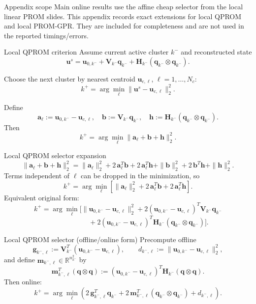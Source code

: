 \documentclass{beamer}
\begin{document}
\begin{frame}{Appendix scope}
\small
Main online results use the affine cheap selector from the local linear PROM slides.
This appendix records exact extensions for local QPROM and local PROM-GPR.
They are included for completeness and are not used in the reported timings/errors.
\end{frame}

\begin{frame}{Local QPROM criterion}
\small
Assume current active cluster $k^-$ and reconstructed state
\[
\mathbf u^s
=
\mathbf u_{0,k^-}
+
\mathbf V_{k^-}\mathbf q_{k^-}
+
\mathbf H_{k^-}(\mathbf q_{k^-}\otimes \mathbf q_{k^-}).
\]

Choose the next cluster by nearest centroid $\mathbf u_{c,\ell}$, $\ell=1,\dots,N_c$:
\[
k^+
=
\arg\min_{\ell}
\|\mathbf u^s-\mathbf u_{c,\ell}\|_2^2.
\]

Define
\[
\mathbf a_\ell:=\mathbf u_{0,k^-}-\mathbf u_{c,\ell},
\quad
\mathbf b:=\mathbf V_{k^-}\mathbf q_{k^-},
\quad
\mathbf h:=\mathbf H_{k^-}(\mathbf q_{k^-}\otimes \mathbf q_{k^-}).
\]
Then
\[
k^+=\arg\min_\ell \|\mathbf a_\ell+\mathbf b+\mathbf h\|_2^2.
\]
\end{frame}

\begin{frame}{Local QPROM selector expansion}
\scriptsize
\[
\|\mathbf a_\ell+\mathbf b+\mathbf h\|_2^2
=
\|\mathbf a_\ell\|_2^2
+
2\,\mathbf a_\ell^T\mathbf b
+
2\,\mathbf a_\ell^T\mathbf h
+
\|\mathbf b\|_2^2
+
2\,\mathbf b^T\mathbf h
+
\|\mathbf h\|_2^2.
\]
Terms independent of $\ell$ can be dropped in the minimization, so
\[
k^+
=
\arg\min_\ell
\left[
\|\mathbf a_\ell\|_2^2
+
2\,\mathbf a_\ell^T\mathbf b
+
2\,\mathbf a_\ell^T\mathbf h
\right].
\]
Equivalent original form:
\[
k^+
=
\arg\min_\ell
\Big[
\|\mathbf u_{0,k^-}-\mathbf u_{c,\ell}\|_2^2
+
2(\mathbf u_{0,k^-}-\mathbf u_{c,\ell})^T\mathbf V_{k^-}\mathbf q_{k^-}
\]
\[
\qquad\qquad\qquad
+
2(\mathbf u_{0,k^-}-\mathbf u_{c,\ell})^T
\mathbf H_{k^-}(\mathbf q_{k^-}\otimes\mathbf q_{k^-})
\Big].
\]
\end{frame}

\begin{frame}{Local QPROM selector (offline/online form)}
\small
Precompute offline
\[
\mathbf g_{k^-,\ell}:=\mathbf V_{k^-}^T(\mathbf u_{0,k^-}-\mathbf u_{c,\ell}),
\qquad
d_{k^-,\ell}:=\|\mathbf u_{0,k^-}-\mathbf u_{c,\ell}\|_2^2,
\]
and define $\mathbf m_{k^-,\ell}\in\mathbb R^{n_{k^-}^2}$ by
\[
\mathbf m_{k^-,\ell}^T(\mathbf q\otimes\mathbf q)
:=
(\mathbf u_{0,k^-}-\mathbf u_{c,\ell})^T\mathbf H_{k^-}(\mathbf q\otimes\mathbf q).
\]
Then online:
\[
k^+
=
\arg\min_\ell
\left(
2\,\mathbf g_{k^-,\ell}^T\mathbf q_{k^-}
+
2\,\mathbf m_{k^-,\ell}^T(\mathbf q_{k^-}\otimes\mathbf q_{k^-})
+
d_{k^-,\ell}
\right).
\]
\end{frame}
\end{document}
